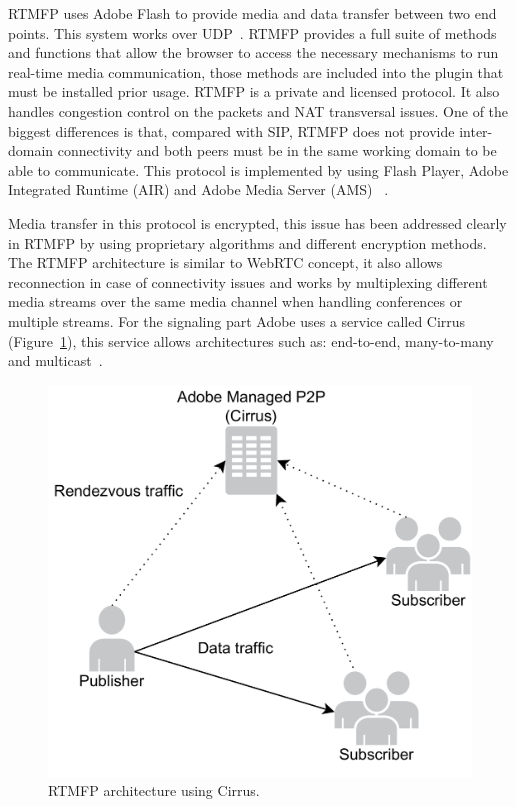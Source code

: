 RTMFP uses Adobe Flash to provide media and data transfer between two end points. This system works over UDP~\cite{rtmfpDraft}. RTMFP provides a full suite of methods and functions that allow the browser to access the necessary mechanisms to run real-time media communication, those methods are included into the plugin that must be installed prior usage. RTMFP is a private and licensed protocol. It also handles congestion control on the packets and NAT transversal issues. One of the biggest differences is that, compared with SIP, RTMFP does not provide inter-domain connectivity and both peers must be in the same working domain to be able to communicate. This protocol is implemented by using Flash Player, Adobe Integrated Runtime (AIR) and Adobe Media Server (AMS) ~\cite{rtmfpDraft}. 

Media transfer in this protocol is encrypted, this issue has been addressed clearly in RTMFP by using proprietary algorithms and different encryption methods. The RTMFP architecture is similar to WebRTC concept, it also allows reconnection in case of connectivity issues and works by multiplexing different media streams over the same media channel when handling conferences or multiple streams. For the signaling part Adobe uses a service called Cirrus (Figure~\ref{fig:RTMFParchitecture}), this service allows architectures such as: end-to-end, many-to-many and multicast~\cite{cirrusFAQ}.
 
 \begin{figure}[h]
  \centering
    \includegraphics[scale=0.4]{./figures/cirrusAdobe.pdf}
      \caption[RTMFP architecture using Cirrus]{RTMFP architecture using Cirrus.}
	\label{fig:RTMFParchitecture}
\end{figure}
 
